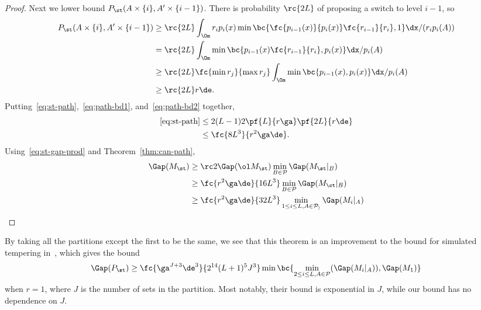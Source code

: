 \begin{proof}
Next we lower bound $P_{\st}(A\times \{i\}, A'\times \{i-1\})$.  There is probability $\rc{2L}$ of proposing a switch to level $i-1$, so
\begin{align}
P_{\st}(A\times \{i\}, A'\times \{i-1\})
&\ge \rc{2L} \int_\Om r_ip_i(x) \min\bc{
\fc{p_{i-1}(x)}{p_i(x)}\fc{r_{i-1}}{r_i}, 1
}\dx/(r_ip_i(A))\\
&=\rc{2L}\int_\Om  \min\bc{p_{i-1}(x)\fc{r_{i-1}}{r_i}, p_i(x)}\dx/p_i(A)\\
&\ge \rc{2L} \fc{\min r_j}{\max r_j} \int_\Om \min\bc{p_{i-1}(x), p_i(x)} \dx /  p_i(A)\\
&\ge \rc{2L} r\de.
\label{eq:path-bd2}
\end{align}
Putting~\eqref{eq:st-path},~\eqref{eq:path-bd1}, and~\eqref{eq:path-bd2} together, 
\begin{align}
\eqref{eq:st-path}&\le 2(L-1)2\pf{L}{r\ga} \pf{2L}{r\de}\\
&\le \fc{8L^3}{r^2\ga \de}.
\end{align}
Using~\eqref{eq:st-gap-prod} and Theorem~\ref{thm:can-path}, 
\begin{align}
\Gap(M_{\st}) &\ge \rc 2 \Gap(\ol M_{\st})\min_{B\in \cal P} \Gap(M_{\st}|_B)\\
&\ge \fc{r^2\ga \de}{16L^3} \min_{B\in \cal P} \Gap(M_{\st}|_B)\\
&\ge \fc{r^2\ga \de}{32L^3} \min_{1\le i\le L, A\in \cal P_i} \Gap(M_{i}|_A)
\end{align}
\end{proof}

By taking all the partitions except the first to be the same, we see that this theorem is an improvement to the bound for simulated tempering in~\cite[Theorem 3.1]{woodard2009conditions}, which gives the bound 
$$
\Gap(P_{\st}) \ge\fc{\ga^{J+3} \de^3}{2^{14}(L+1)^5J^3} \min\bc{
\min_{2\le i\le L, A\in \cal P} (\Gap(M_{i}|_A)), \Gap(M_1)}
$$
when $r=1$, where $J$ is the number of sets in the partition. Most notably, their bound is exponential in $J$, while our bound has no dependence on $J$.
%
